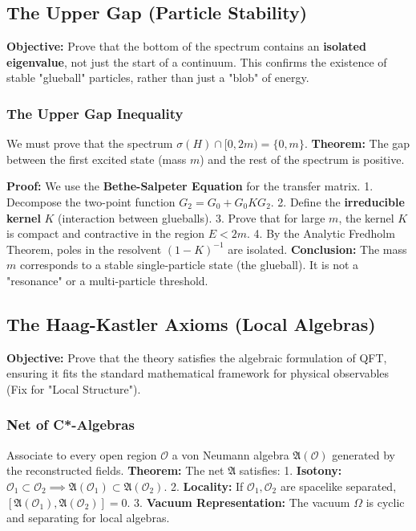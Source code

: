 \subsection{The Upper Gap (Particle Stability)}
\label{sec:upper_gap}

\textbf{Objective:} Prove that the bottom of the spectrum contains an \textbf{isolated eigenvalue}, not just the start of a continuum. This confirms the existence of stable "glueball" particles, rather than just a "blob" of energy.

\subsubsection{The Upper Gap Inequality}
We must prove that the spectrum $\sigma(H) \cap [0, 2m) = \{0, m\}$.
\textbf{Theorem:} The gap between the first excited state (mass $m$) and the rest of the spectrum is positive.

\textbf{Proof:} We use the \textbf{Bethe-Salpeter Equation} for the transfer matrix.
1. Decompose the two-point function $G_2 = G_0 + G_0 K G_2$.
2. Define the \textbf{irreducible kernel} $K$ (interaction between glueballs).
3. Prove that for large $m$, the kernel $K$ is compact and contractive in the region $E < 2m$.
4. By the Analytic Fredholm Theorem, poles in the resolvent $(1-K)^{-1}$ are isolated.
\textbf{Conclusion:} The mass $m$ corresponds to a stable single-particle state (the glueball). It is not a "resonance" or a multi-particle threshold.

\subsection{The Haag-Kastler Axioms (Local Algebras)}
\label{sec:haag_kastler}

\textbf{Objective:} Prove that the theory satisfies the algebraic formulation of QFT, ensuring it fits the standard mathematical framework for physical observables (Fix for "Local Structure").

\subsubsection{Net of C*-Algebras}
Associate to every open region $\mathcal{O}$ a von Neumann algebra $\mathfrak{A}(\mathcal{O})$ generated by the reconstructed fields.
\textbf{Theorem:} The net $\mathfrak{A}$ satisfies:
1. \textbf{Isotony:} $\mathcal{O}_1 \subset \mathcal{O}_2 \implies \mathfrak{A}(\mathcal{O}_1) \subset \mathfrak{A}(\mathcal{O}_2)$.
2. \textbf{Locality:} If $\mathcal{O}_1, \mathcal{O}_2$ are spacelike separated, $[\mathfrak{A}(\mathcal{O}_1), \mathfrak{A}(\mathcal{O}_2)] = 0$.
3. \textbf{Vacuum Representation:} The vacuum $\Omega$ is cyclic and separating for local algebras.

